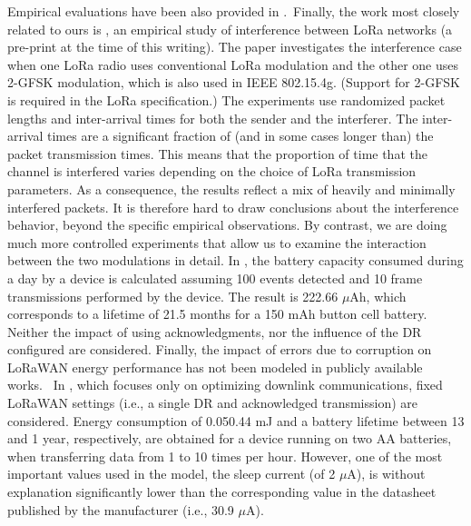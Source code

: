  \cite{mikhaylov_lorawan_2017}   Empirical evaluations have been also provided in \cite{mikhaylov_lorawan_2017}.~Finally, the work most closely related to ours is \cite{mikhaylov_lorawan_2017}, an empirical study of interference between LoRa networks (a pre-print at the time of this writing). The paper investigates the interference case when one LoRa radio uses conventional LoRa modulation and the other one uses 2-GFSK modulation, which is also used in IEEE 802.15.4g. (Support for 2-GFSK is required in the LoRa specification.) The experiments use randomized packet lengths and inter-arrival times for both the sender and the interferer. The inter-arrival times are a significant fraction of (and in some cases longer than) the packet transmission times. This means that the proportion of time that the channel is interfered varies depending on the choice of LoRa transmission parameters. As a consequence, the results reflect a mix of heavily and minimally interfered packets. It is therefore hard to draw conclusions about the interference behavior, beyond the specific empirical observations. By contrast, we are doing much more controlled experiments that allow us to examine the interaction between the two modulations in detail.   \newline 
 \cite{conus_event-driven_2016}   In \cite{conus_event-driven_2016}, the battery capacity consumed during a day by a device is calculated assuming 100 events detected and 10 frame transmissions performed by the device. The result is 222.66 {$\mu$}Ah, which corresponds to a lifetime of 21.5 months for a 150 mAh button cell battery. Neither the impact of using acknowledgments, nor the influence of the DR configured are considered. Finally, the impact of errors due to corruption on LoRaWAN energy performance has not been modeled in publicly available works.~   \newline 
 \cite{kim_cooperative_2017}   In \cite{kim_cooperative_2017}, which focuses only on optimizing downlink communications, fixed LoRaWAN settings (i.e., a single DR and acknowledged transmission) are considered. Energy consumption of 0.05\textendash{}0.44 mJ and a battery lifetime between 13 and 1 year, respectively, are obtained for a device running on two AA batteries, when transferring data from 1 to 10 times per hour. However, one of the most important values used in the model, the sleep current (of 2 {$\mu$}A), is without explanation significantly lower than the corresponding value in the datasheet published by the manufacturer (i.e., 30.9 {$\mu$}A).~   \newline 
